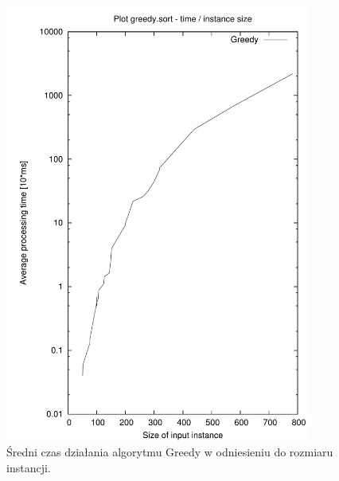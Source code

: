 \begin{figure}
\begin{center}
\includegraphics[width=0.9\textwidth]{wykresy/greedy_time}
\end{center}
\caption{Średni czas działania algorytmu Greedy w odniesieniu do rozmiaru instancji.}
\label{greedy_time}
\end{figure}


